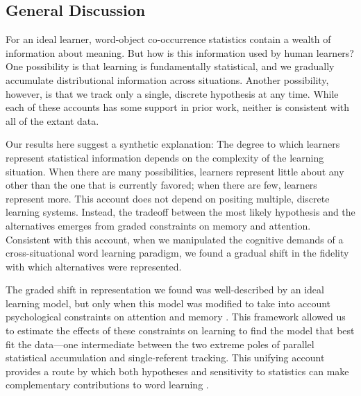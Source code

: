 \documentclass{pnastwo}
\begin{document}
\begin{article}
\section{General Discussion}

For an ideal learner, word-object co-occurrence statistics contain a wealth of information about meaning. But how is this information used by human learners? One possibility is that learning is fundamentally statistical, and we gradually accumulate distributional information across situations. Another possibility, however, is that we track only a single, discrete hypothesis at any time. While each of these accounts has some support in prior work, neither is consistent with all of the extant data.

Our results here suggest a synthetic explanation: The degree to which learners represent statistical information depends on the complexity of the learning situation. When there are many possibilities, learners represent little about any other than the one that is currently favored; when there are few, learners represent more. This account does not depend on positing multiple, discrete learning systems. Instead, the tradeoff between the most likely hypothesis and the alternatives emerges from graded constraints on memory and attention. Consistent with this account, when we manipulated the cognitive demands of a cross-situational word learning paradigm, we found a gradual shift in the fidelity with which alternatives were represented.

The graded shift in representation we found was well-described by an ideal learning model, but only when this model was modified to take into account psychological constraints on attention and memory \citep{Kachergis2012,Vlach2013,Yurovsky2014}. This framework allowed us to estimate the effects of these constraints on learning to find the model that best fit the data---one intermediate between the two extreme poles of parallel statistical accumulation and single-referent tracking. This unifying account provides a route by which both hypotheses and sensitivity to statistics can make complementary contributions to word learning \citep{Waxman2009,Kachergis2013}. 


\end{article}
\end{document}
